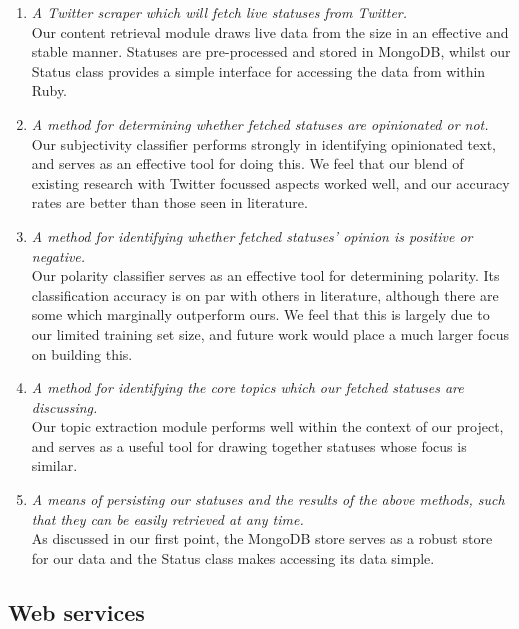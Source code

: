 \begin{enumerate}
		\item \emph{A Twitter scraper which will fetch live statuses from Twitter.} \\
		Our content retrieval module draws live data from the size in an effective and stable manner. Statuses are pre-processed and stored in MongoDB, whilst our Status class provides a simple interface for accessing the data from within Ruby.
		\item \emph{A method for determining whether fetched statuses are opinionated or not.} \\
		Our subjectivity classifier performs strongly in identifying opinionated text, and serves as an effective tool for doing this. We feel that our blend of existing research with Twitter focussed aspects worked well, and our accuracy rates are better than those seen in literature.
		\item \emph{A method for identifying whether fetched statuses' opinion is positive or negative.} \\
		Our polarity classifier serves as an effective tool for determining polarity. Its classification accuracy is on par with others in literature, although there are some which marginally outperform ours. We feel that this is largely due to our limited training set size, and future work would place a much larger focus on building this.
		\item \emph{A method for identifying the core topics which our fetched statuses are discussing.} \\
		Our topic extraction module performs well within the context of our project, and serves as a useful tool for drawing together statuses whose focus is similar.
		\item \emph{A means of persisting our statuses and the results of the above methods, such that they can be easily retrieved at any time.} \\
		As discussed in our first point, the MongoDB store serves as a robust store for our data and the Status class makes accessing its data simple. 
\end{enumerate}

\subsection{Web services}

